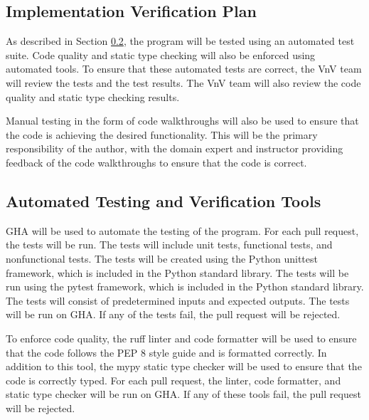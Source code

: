 \documentclass[12pt, titlepage]{article}
\begin{document}
\subsection{Implementation Verification Plan}

As described in Section \ref{sec:AutomatedTesting}, the \progname{} program will
be tested using an automated test suite. Code quality and static type checking
will also be enforced using automated tools. To ensure that these automated
tests are correct, the VnV team will review the tests and the test results. The
VnV team will also review the code quality and static type checking results.

Manual testing in the form of code walkthroughs will also be used to ensure that
the code is achieving the desired functionality. This will be the primary
responsibility of the author, with the domain expert and instructor providing
feedback of the code walkthroughs to ensure that the code is correct.




\subsection{Automated Testing and Verification Tools}
\label{sec:AutomatedTesting}

GHA will be used to automate the testing of the \progname{} program. For
each pull request, the tests will be run. The tests will include unit tests,
functional tests, and nonfunctional tests. The tests will be created using the
Python unittest framework, which is included in the Python standard library. The
tests will be run using the pytest framework, which is included in the Python
standard library. The tests will consist of predetermined inputs and expected
outputs. The tests will be run on GHA. If any of the tests fail, the
pull request will be rejected.

To enforce code quality, the ruff linter and code formatter will be used to
ensure that the code follows the PEP 8 style guide and is formatted correctly.
In addition to this tool, the mypy static type checker will be used to ensure
that the code is correctly typed. For each pull request, the linter, code
formatter, and static type checker will be run on GHA. If any of
these tools fail, the pull request will be rejected.
\end{document}
